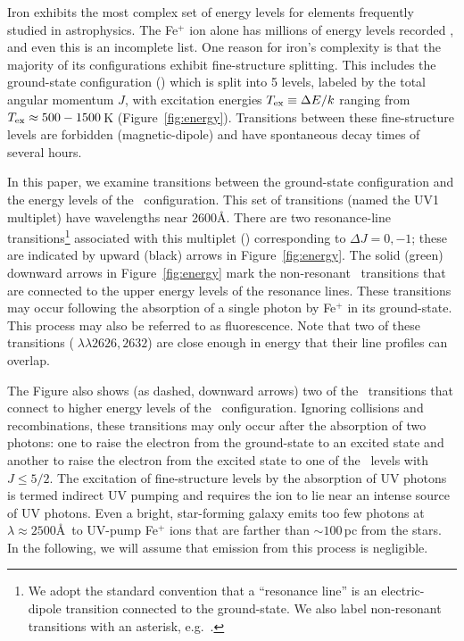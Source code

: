 \documentclass[]{emulateapj}
\begin{document}
Iron exhibits the most complex set of energy levels for elements
frequently studied in astrophysics.  The Fe$^+$ ion alone has 
millions of energy levels recorded \citep{kurucz05}, and even this is an
incomplete list.  
One reason for iron's complexity is
that the majority of its configurations exhibit fine-structure splitting.
This includes the ground-state configuration (\aconfig) which is split
into 5 levels, 
labeled by the total angular momentum $J$, 
with excitation energies $T_{\rm ex} \equiv \Delta E / k$ ranging from
$T_{\rm ex} \approx 500-1500$\,K (Figure~\ref{fig:energy}).  
Transitions between these fine-structure levels are 
forbidden (magnetic-dipole) and have spontaneous decay times of several hours.  

In this paper, we examine transitions between the ground-state
configuration and the energy levels of the \zconfig\
configuration.  This set of transitions (named the
UV1 multiplet) have wavelengths near 2600\AA.
There are two resonance-line transitions\footnote{We adopt the
  standard convention that a ``resonance line'' is an electric-dipole
  transition connected to the ground-state.  We also label
  non-resonant transitions with an asterisk, e.g.\ \feiic.} 
associated with this multiplet (\feiid)
corresponding to $\Delta J = 0, -1$; these are indicated by upward (black) arrows
in Figure~\ref{fig:energy}. The solid (green) downward
arrows in Figure~\ref{fig:energy} mark the non-resonant \feiis\
transitions that are connected to
the upper energy levels of the resonance lines.  These transitions may
occur following the absorption of a single photon by Fe$^+$ in its
ground-state.   This process may also be referred to as fluorescence.
Note that two of these transitions (\feiis$\; \lambda\lambda 2626, 2632$) are
close enough in energy that their line profiles can overlap.

The Figure also shows (as dashed, downward arrows) two of the
\feiis\ transitions that connect to higher energy levels of the \zconfig\
configuration.  Ignoring collisions and recombinations, these
transitions may only occur after the absorption
of two photons: one to raise the electron from the ground-state to an
excited state and another to raise the electron from the excited state
to one of the \zconfig\ levels with $J \le 5/2$.  The excitation of
fine-structure levels by 
the absorption of UV photons is termed indirect UV pumping
\citep[e.g][]{silva02,pcb06} and requires the ion to lie
near an intense source of UV photons.  
Even a bright, star-forming galaxy emits too few photons at $\lambda
\approx 2500$\AA\ to UV-pump Fe$^+$ ions that are farther than $\sim
100$\,pc from the stars.
In the
following, we will assume that emission from this process is
negligible.
\end{document}
